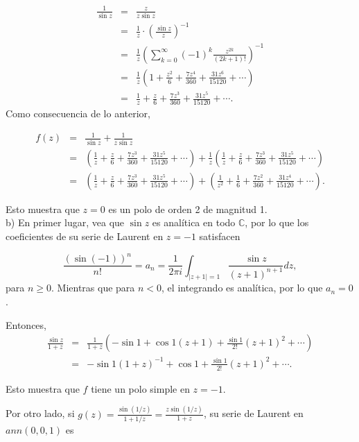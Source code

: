 \documentclass[12pt]{article}
\newcommand{\C}{\mathbb{C}}
\begin{document}
\begin{eqnarray*}
\frac{1}{\sin z} &=& \frac{z}{z \sin z} \\
&=& \frac{1}{z} \cdot \left( \frac{\sin z}{z} \right)^{-1}\\
&=& \frac{1}{z} \left( \sum_{k=0}^\infty (-1)^{k} \frac{z^{2k}}{(2k+1)!}  \right)^{-1}\\
&=& \frac{1}{z} \left(1 + \frac{z^2}{6} + \frac{7z^4}{360} + \frac{31z^6}{15120} + \cdots \right)\\
&=& \frac{1}{z} + \frac{z}{6} + \frac{7z^3}{360} + \frac{31z^5}{15120} + \cdots.
\end{eqnarray*}
Como consecuencia de lo anterior,

\begin{eqnarray*}
f(z) &=& \frac{1}{\sin z} + \frac{1}{z \sin z}\\
&=& \left(\frac{1}{z} + \frac{z}{6} + \frac{7z^3}{360} + \frac{31z^5}{15120} + \cdots \right) + \frac{1}{z} \left( \frac{1}{z} + \frac{z}{6} + \frac{7z^3}{360} + \frac{31z^5}{15120} + \cdots \right)\\
&=& \left(\frac{1}{z} + \frac{z}{6} + \frac{7z^3}{360} + \frac{31z^5}{15120} + \cdots \right) + \left( \frac{1}{z^2} + \frac{1}{6} + \frac{7z^2}{360} + \frac{31z^4}{15120} + \cdots \right).
\end{eqnarray*}

Esto muestra que $z=0$ es un polo de orden 2 de magnitud 1.\\

b) En primer lugar, vea que $\sin z$ es analítica en todo $\C$, por lo que los coeficientes de su serie de Laurent en $z=-1$ satisfacen

$$\frac{(\sin(-1))^{n}}{n!} = a_n = \frac{1}{2\pi i} \int_{\vert z+1 \rvert = 1} \frac{\sin z}{(z+1)^{n+1}} dz,$$
para $n \geq 0$. Mientras que para $n<0$, el integrando es analítica, por lo que $a_n =0$.

Entonces,
\begin{eqnarray*}
 \frac{\sin z}{1+z} &=& \frac{1}{1+z} \left(-\sin 1 + \cos 1 (z+1) + \frac{\sin 1 }{2!}(z+1)^2 + \cdots \right) \\
 &=& -\sin 1 (1+z)^{-1} + \cos 1 + \frac{\sin 1}{2!} (z+1)^2 + \cdots.
\end{eqnarray*}

Esto muestra que $f$ tiene un polo simple en $z=-1.$


Por otro lado, si $g(z) = \frac{\sin(1/z)}{1 + 1/z} = \frac{z \sin(1/z)}{1 + z}$, su serie de Laurent  en $ann(0, 0, 1)$ es
\end{document}
